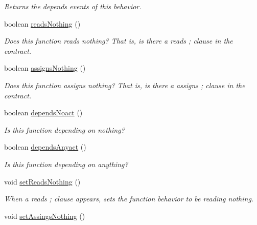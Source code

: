 \begin{DoxyCompactItemize}
\begin{DoxyCompactList}\small\item\em Returns the depends events of this behavior. \end{DoxyCompactList}\item 
boolean \hyperlink{interfaceedu_1_1udel_1_1cis_1_1vsl_1_1civl_1_1model_1_1IF_1_1contract_1_1FunctionBehavior_a186bf1d130895cef4e0ff1501cf5e782}{reads\+Nothing} ()
\begin{DoxyCompactList}\small\item\em Does this function reads nothing? That is, is there a {\ttfamily reads ;} clause in the contract. \end{DoxyCompactList}\item 
boolean \hyperlink{interfaceedu_1_1udel_1_1cis_1_1vsl_1_1civl_1_1model_1_1IF_1_1contract_1_1FunctionBehavior_a78e6bb4496fbbf13f9facd500e08160a}{assigns\+Nothing} ()
\begin{DoxyCompactList}\small\item\em Does this function assigns nothing? That is, is there a {\ttfamily assigns ;} clause in the contract. \end{DoxyCompactList}\item 
boolean \hyperlink{interfaceedu_1_1udel_1_1cis_1_1vsl_1_1civl_1_1model_1_1IF_1_1contract_1_1FunctionBehavior_a0e43e6b5ebfcdee6c9d969422dc10316}{depends\+Noact} ()
\begin{DoxyCompactList}\small\item\em Is this function depending on nothing? \end{DoxyCompactList}\item 
boolean \hyperlink{interfaceedu_1_1udel_1_1cis_1_1vsl_1_1civl_1_1model_1_1IF_1_1contract_1_1FunctionBehavior_a5b6512bd2ba9313b195dc2a443e1b1c4}{depends\+Anyact} ()
\begin{DoxyCompactList}\small\item\em Is this function depending on anything? \end{DoxyCompactList}\item 
void \hyperlink{interfaceedu_1_1udel_1_1cis_1_1vsl_1_1civl_1_1model_1_1IF_1_1contract_1_1FunctionBehavior_acd33ade2e37990a8d4bc5f80a1d65eb5}{set\+Reads\+Nothing} ()
\begin{DoxyCompactList}\small\item\em When a {\ttfamily reads ;} clause appears, sets the function behavior to be reading nothing. \end{DoxyCompactList}\item 
void \hyperlink{interfaceedu_1_1udel_1_1cis_1_1vsl_1_1civl_1_1model_1_1IF_1_1contract_1_1FunctionBehavior_a6c2b0741275e9558090ecaf2bed73637}{set\+Assings\+Nothing} ()

\end{DoxyCompactItemize}
